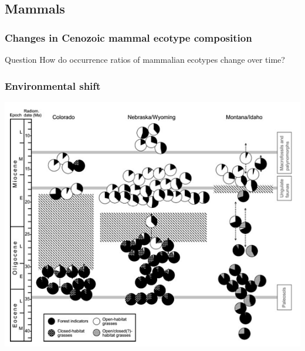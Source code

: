 \documentclass{beamer}
\begin{document}
\subsection{Mammals}
\begin{frame}
  \frametitle{Changes in Cenozoic mammal ecotype composition}

  \begin{alertblock}{Question}
    How do occurrence ratios of mammalian ecotypes change over time?
  \end{alertblock}
\end{frame}

\begin{frame}
  \frametitle{Environmental shift}
  \begin{center}
    \includegraphics[width=\textwidth,height=0.8\textheight,keepaspectratio=true]{figure/stromberg_na}
  \end{center}

\end{frame}

\end{document}
